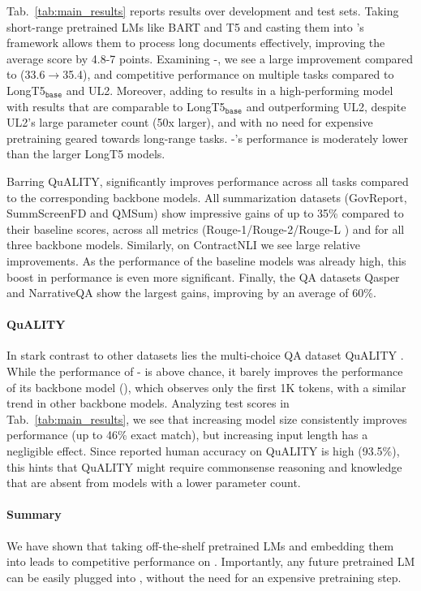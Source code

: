 Tab.~\ref{tab:main_results} reports results over \SCROLLS{} development and test sets.
Taking short-range pretrained LMs like BART and T5 and casting them into \sled{}'s framework allows them to process long documents effectively, improving the average \SCROLLS{} score by 4.8-7 points.
Examining \bartbase{}-\sled{}, we see a large improvement compared to \ledbase{} (33.6$\rightarrow$35.4), and competitive performance on multiple tasks compared to LongT5$_{\mathtt{base}}$ and UL2.
Moreover, adding \sled{} to \bartlarge{}
results in a high-performing model
with results that are comparable to LongT5$_{\mathtt{base}}$ and outperforming UL2, despite UL2's large parameter count (50x larger), and with no need for expensive pretraining geared towards long-range tasks. \bartlarge{}-\sled{}'s performance is moderately lower than the larger LongT5 models.


Barring QuALITY, \sled{} significantly improves performance across all tasks compared to the corresponding backbone models.
All summarization datasets (GovReport, SummScreenFD and QMSum) show impressive gains of up to 35\% compared to their baseline scores, across all metrics (Rouge-1/Rouge-2/Rouge-L \cite{Lin2004ROUGEAP}) and for all three backbone models. 
Similarly, on ContractNLI \cite{koreeda-manning-2021-contractnli-dataset} we see large relative improvements. As the performance of the baseline models was already high, this boost in performance is even more significant.
Finally, the QA datasets Qasper and NarrativeQA show the largest gains, improving by an average of 60\%.


\paragraph{QuALITY} In stark contrast to other datasets lies the multi-choice QA dataset QuALITY \cite{pang2021quality}. While the performance of \bartlarge{}-\sled{} is above chance, it barely improves the performance of its backbone model (\bartlarge{}), which observes only the first 1K tokens, with a similar trend in other backbone models. Analyzing test scores in Tab.~\ref{tab:main_results}, we see  that
increasing model size consistently improves performance (up to 46\% exact match), but increasing input length has a negligible effect. 
Since reported human accuracy on QuALITY is high (93.5\%), this hints that QuALITY might require commonsense reasoning and knowledge that are absent from models with a lower parameter count.

\paragraph{Summary}
We have shown that taking off-the-shelf pretrained LMs and embedding them into \sled{} leads to competitive performance on \SCROLLS{}. Importantly, any future pretrained LM can be easily plugged into \sled{}, without the need for an expensive pretraining step.


